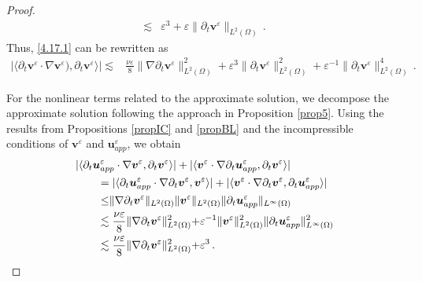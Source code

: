 \documentclass[10pt,a4paper]{amsart}
\begin{document}
\begin{proof}
\begin{align}
		\lesssim&\varepsilon^3 
		+
		\varepsilon 
		\lVert\partial_t\boldsymbol v^{\varepsilon}\rVert_{{L}^2(\Omega)}\,.
	\end{align} 
	Thus, \eqref{4.17.1} can be rewritten as
	\begin{align}\label{4.17.2}
		|\langle
		\partial_t{\boldsymbol v}^{\varepsilon} \cdot \nabla\boldsymbol{v}^\varepsilon)
		,\partial_t{\boldsymbol v}^{\varepsilon}\rangle|
		\lesssim&
		\frac{\nu\varepsilon}{8}
		\rVert
		\nabla\partial_t{\boldsymbol v}^{\varepsilon} 	\lVert^{2}_{{L}^2(\Omega)}
		+
		\varepsilon^{3}\lVert
		\partial_t{\boldsymbol v}^{\varepsilon} 	\rVert^{2}_{{L}^2(\Omega)}
		+
		\varepsilon^{-1}\lVert
		\partial_t{\boldsymbol v}^{\varepsilon} 	\rVert^{4}_{{L}^2(\Omega)}
		\,.
	\end{align}
	
	
	
	For the nonlinear terms related to the approximate solution, we decompose the approximate solution following the approach in Proposition \ref{prop5}. Using the results from Propositions \ref{propIC} and \ref{propBL} and the incompressible conditions of $\boldsymbol{v}^\varepsilon$ and $\boldsymbol{u}^\varepsilon_{app}$, we obtain
	\begin{align}\label{4.21.1}
		&|\langle
		\partial_t{\boldsymbol u}_{app}^{\varepsilon} \cdot \nabla\boldsymbol{v}^\varepsilon
		,\partial_t{\boldsymbol v}^{\varepsilon}\rangle|
		+
		|\langle{\boldsymbol v}^{\varepsilon} \cdot \nabla\partial_t\boldsymbol{u}^\varepsilon_{app},
		\partial_t{\boldsymbol v}^{\varepsilon}\rangle|	
		\notag\\
		&\qquad=|\langle
		\partial_t{\boldsymbol u}_{app}^{\varepsilon} \cdot \nabla\partial_t\boldsymbol{v}^\varepsilon
		,{\boldsymbol v}^{\varepsilon}\rangle|
		+
		|\langle{\boldsymbol v}^{\varepsilon} \cdot \nabla\partial_t{\boldsymbol v}^{\varepsilon},
		\partial_t\boldsymbol{u}^\varepsilon_{app}\rangle|	
		\notag\\
		&\qquad\leq
		\rVert
		\nabla\partial_t{\boldsymbol v}^{\varepsilon} 	\lVert_{{L}^2(\Omega)}
		\rVert
		{\boldsymbol v}^{\varepsilon} 	\lVert_{{L}^2(\Omega)}
		\rVert
		\partial_t\boldsymbol{u}^\varepsilon_{app}
		\lVert_{{L}^\infty(\Omega)}\notag\\
		&\qquad\lesssim
		\frac{\nu\varepsilon}{8}
		\rVert
		\nabla\partial_t{\boldsymbol v}^{\varepsilon} 	\lVert^{2}_{{L}^2(\Omega)}
		+
		\varepsilon^{-1}\rVert
		{\boldsymbol v}^{\varepsilon} 	\lVert^2_{{L}^2(\Omega)}
		\rVert
		\partial_t\boldsymbol{u}^\varepsilon_{app}\lVert^2_{{L}^\infty(\Omega)}
		\notag\\
		&\qquad\lesssim
		\frac{\nu\varepsilon}{8}
		\rVert
		\nabla\partial_t{\boldsymbol v}^{\varepsilon} 	\lVert^{2}_{{L}^2(\Omega)}
		+
		\varepsilon^3
		\,.
	\end{align}
	

\end{proof}
\end{document}
